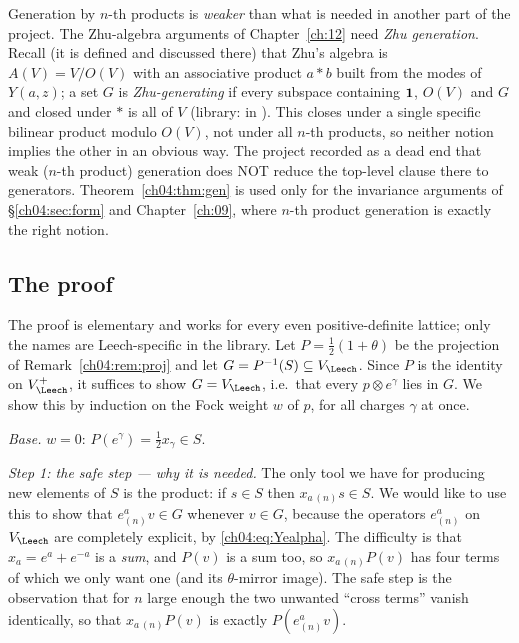 \begin{warning}
Generation by $n$-th products is \emph{weaker} than what is needed in another part of the project.
The Zhu-algebra arguments of Chapter~\ref{ch:12} need \emph{Zhu generation}. Recall (it is
defined and discussed there) that Zhu's algebra is $A(V)=V/O(V)$ with an associative product $a*b$
built from the modes of $Y(a,z)$; a set $G$ is \emph{Zhu-generating} if every subspace containing
$\mathbf{1}$, $O(V)$ and $G$ and closed under $*$ is all of $V$ (library:  in
). This closes under a single specific bilinear product
modulo $O(V)$, not under all $n$-th products, so neither notion implies the other in an obvious way.
The project recorded as a dead end that weak ($n$-th product) generation does NOT
reduce the top-level clause there to generators. Theorem~\ref{ch04:thm:gen} is used only for the
invariance arguments of \S\ref{ch04:sec:form} and Chapter~\ref{ch:09}, where $n$-th product
generation is exactly the right notion.
\end{warning}

\subsection{The proof}

The proof is elementary and works for every even positive-definite lattice; only the names are
Leech-specific in the library. Let $P=\tfrac12(1+\theta)$ be the projection of
Remark~\ref{ch04:rem:proj} and let $G=P^{-1}(S)\subseteq V_\Leech$. Since $P$ is the identity on
$V_\Leech^+$, it suffices to show $G=V_\Leech$, i.e.\ that every $p\otimes e^\gamma$ lies in $G$. We
show this by induction on the Fock weight $w$ of $p$, for all charges $\gamma$ at once.

\emph{Base.} $w=0$: $P(e^\gamma)=\tfrac12x_\gamma\in S$.

\emph{Step 1: the safe step --- why it is needed.} The only tool we have for producing new
elements of $S$ is the product: if $s\in S$ then $x_{a\,(n)}s\in S$. We would like to use this to
show that $e^a_{(n)}v\in G$ whenever $v\in G$, because the operators $e^a_{(n)}$ on $V_\Leech$ are
completely explicit, by \eqref{ch04:eq:Yealpha}. The difficulty is that $x_a=e^a+e^{-a}$ is a
\emph{sum}, and $P(v)$ is a sum too, so $x_{a\,(n)}P(v)$ has four terms of which we only want one
(and its $\theta$-mirror image). The safe step is the observation that for $n$ large enough the
two unwanted ``cross terms'' vanish identically, so that $x_{a\,(n)}P(v)$ is exactly $P(e^a_{(n)}v)$.

